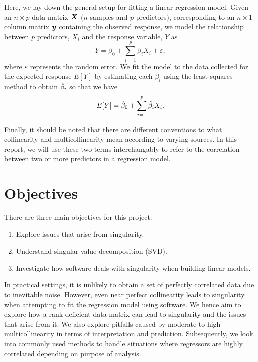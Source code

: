 \documentclass[12pt]{article}
\newcommand{\gbh}{\hat{\gb}}
\begin{document}
	Here, we lay down the general setup for fitting a linear regression model. Given an $n\times p$ data matrix $\boldsymbol{X}$ ($n$ samples and $p$ predictors), corresponding to an $n\times 1$ column matrix $\boldsymbol{y}$ containing the observed response, we model the relationship between $p$ predictors, $X_i$  and the response variable, $Y$ as
	$$Y=\beta_0+\sum_{i=1}^{p}\beta_i X_i+\varepsilon,$$
	where $\varepsilon$ represents the random error. We fit the model to the data collected for the expected response $E[Y]$ by estimating each $\beta_i$ using the least squares method to obtain $\gbh_i$ so that we have
	$$E[Y]=\gbh_0+\sum_{i=1}^{p}\gbh_iX_i.$$
	
	Finally, it should be noted that there are different conventions to what collinearity and multicollinearity mean according to varying sources. In this report, we will use these two terms interchangably to refer to the correlation between two or more predictors in a regression model.
	
	\section{Objectives}
	
	There are three main objectives for this project:
	
	\begin{enumerate}
		\item Explore issues that arise from singularity.
		\item Understand singular value decomposition (SVD).
		\item Investigate how software deals with singularity when building linear models.
	\end{enumerate}
	
	In practical settings, it is unlikely to obtain a set of perfectly correlated data due to inevitable noise. However, even near perfect collinearity leads to singularity when attempting to fit the regression model using software. We hence aim to explore how a rank-deficient data matrix can lead to singularity and the issues that arise from it. We also explore pitfalls caused by moderate to high multicollinearity in terms of interpretation and prediction. Subsequently, we look into commonly used methods to handle situations where regressors are highly correlated depending on purpose of analysis.\\
	
\end{document}
